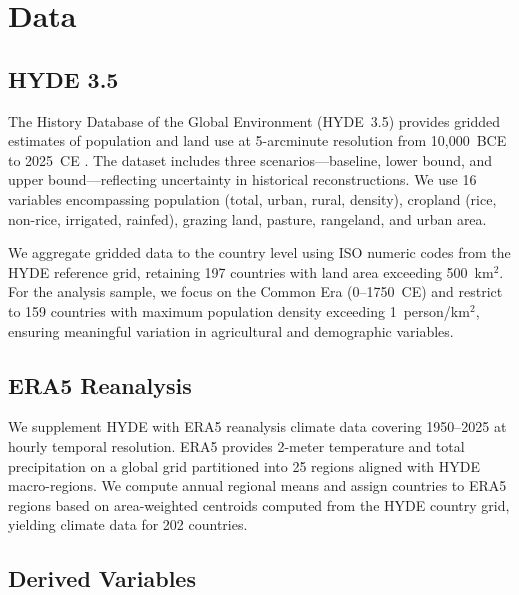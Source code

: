 \documentclass[12pt,letterpaper]{article}
\begin{document}
\section{Data}

\subsection{HYDE 3.5}

The History Database of the Global Environment (HYDE~3.5) provides gridded estimates of population and land use at 5-arcminute resolution from 10,000~BCE to 2025~CE \citep{goldewijk2017}. The dataset includes three scenarios---baseline, lower bound, and upper bound---reflecting uncertainty in historical reconstructions. We use 16 variables encompassing population (total, urban, rural, density), cropland (rice, non-rice, irrigated, rainfed), grazing land, pasture, rangeland, and urban area.

We aggregate gridded data to the country level using ISO numeric codes from the HYDE reference grid, retaining 197 countries with land area exceeding 500~km$^2$. For the analysis sample, we focus on the Common Era (0--1750~CE) and restrict to 159 countries with maximum population density exceeding 1~person/km$^2$, ensuring meaningful variation in agricultural and demographic variables.

\subsection{ERA5 Reanalysis}

We supplement HYDE with ERA5 reanalysis climate data \citep{hersbach2020era5} covering 1950--2025 at hourly temporal resolution. ERA5 provides 2-meter temperature and total precipitation on a global grid partitioned into 25 regions aligned with HYDE macro-regions. We compute annual regional means and assign countries to ERA5 regions based on area-weighted centroids computed from the HYDE country grid, yielding climate data for 202 countries.

\subsection{Derived Variables}
\end{document}
